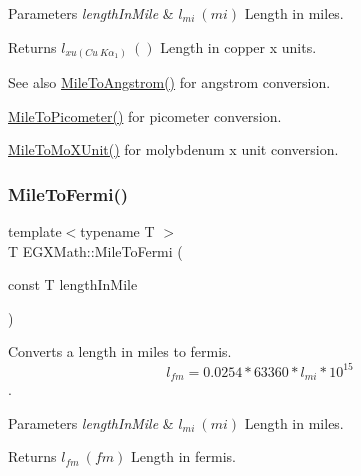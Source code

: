 \begin{DoxyParams}{Parameters}
{\em length\+In\+Mile} & $ l_{mi}\ (mi)$ Length in miles. \\
\hline
\end{DoxyParams}
\begin{DoxyReturn}{Returns}
$ l_{xu(Cu\ K\alpha_1)}\ ()$ Length in copper x units. 
\end{DoxyReturn}
\begin{DoxySeeAlso}{See also}
\mbox{\hyperlink{group___e_g_x_math-_conversions-_length_conversions-_imperial-_mile-_non-_s_i_ga291d6035f59be619459011941676f7c7}{Mile\+To\+Angstrom()}} for angstrom conversion. 

\mbox{\hyperlink{group___e_g_x_math-_conversions-_length_conversions-_imperial-_mile-_s_i_ga470a1271de988c28cb4851e5930d99da}{Mile\+To\+Picometer()}} for picometer conversion. 

\mbox{\hyperlink{group___e_g_x_math-_conversions-_length_conversions-_imperial-_mile-_non-_s_i_gadefb09bf42157adb9c7a458b93e3a851}{Mile\+To\+Mo\+X\+Unit()}} for molybdenum x unit conversion. 
\end{DoxySeeAlso}
\mbox{\label{group___e_g_x_math-_conversions-_length_conversions-_imperial-_mile-_non-_s_i_gaf09d006cf827d210a8506e1add02cb0b}} 
\subsubsection{\texorpdfstring{Mile\+To\+Fermi()}{MileToFermi()}}
{\footnotesize\ttfamily template$<$typename T $>$ \\
T E\+G\+X\+Math\+::\+Mile\+To\+Fermi (\begin{DoxyParamCaption}\item[{const T}]{length\+In\+Mile }\end{DoxyParamCaption})}



Converts a length in miles to fermis. \[ l_{fm}=0.0254 * 63360 * l_{mi} * 10^{15} \]. 


\begin{DoxyParams}{Parameters}
{\em length\+In\+Mile} & $ l_{mi}\ (mi)$ Length in miles. \\
\hline
\end{DoxyParams}
\begin{DoxyReturn}{Returns}
$ l_{fm}\ (fm)$ Length in fermis. 
\end{DoxyReturn}
\mbox{\label{group___e_g_x_math-_conversions-_length_conversions-_imperial-_mile-_non-_s_i_ga0ab31c74561b6127ec6639c17c5c94e5}} 
